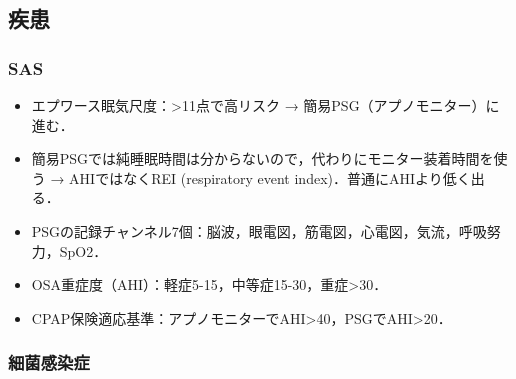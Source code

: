 \subsection{疾患}

\subsubsection{SAS}

\begin{itemize}
\item エプワース眠気尺度：>11点で高リスク → 簡易PSG（アプノモニター）に進む．


\item 簡易PSGでは純睡眠時間は分からないので，代わりにモニター装着時間を使う → AHIではなくREI (respiratory event index)．普通にAHIより低く出る．
\item PSGの記録チャンネル7個：脳波，眼電図，筋電図，心電図，気流，呼吸努力，SpO2．

\item OSA重症度（AHI）：軽症5-15，中等症15-30，重症>30．
\item CPAP保険適応基準：アプノモニターでAHI>40，PSGでAHI>20．

\end{itemize}

\subsubsection{細菌感染症}

